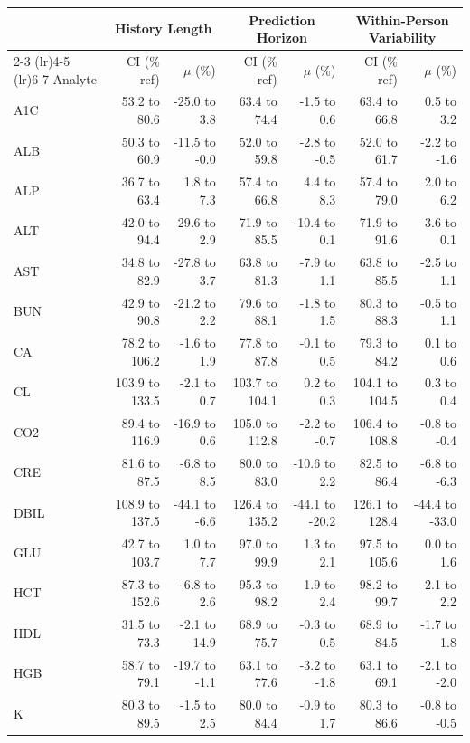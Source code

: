 \begin{table}[ht]
\centering
\footnotesize
\begin{tabular}{lrrrrrr}
\toprule
  & \multicolumn{2}{c}{History Length} & \multicolumn{2}{c}{Prediction Horizon} & \multicolumn{2}{c}{Within-Person Variability} \\
\cmidrule(lr){2-3} \cmidrule(lr){4-5} \cmidrule(lr){6-7}
Analyte & CI (\% ref) & $\mu$ (\%) & CI (\% ref) & $\mu$ (\%) & CI (\% ref) & $\mu$ (\%) \\
\midrule
A1C & 53.2 to 80.6 & -25.0 to 3.8 & 63.4 to 74.4 & -1.5 to 0.6 & 63.4 to 66.8 & 0.5 to 3.2 \\
ALB & 50.3 to 60.9 & -11.5 to -0.0 & 52.0 to 59.8 & -2.8 to -0.5 & 52.0 to 61.7 & -2.2 to -1.6 \\
ALP & 36.7 to 63.4 & 1.8 to 7.3 & 57.4 to 66.8 & 4.4 to 8.3 & 57.4 to 79.0 & 2.0 to 6.2 \\
ALT & 42.0 to 94.4 & -29.6 to 2.9 & 71.9 to 85.5 & -10.4 to 0.1 & 71.9 to 91.6 & -3.6 to 0.1 \\
AST & 34.8 to 82.9 & -27.8 to 3.7 & 63.8 to 81.3 & -7.9 to 1.1 & 63.8 to 85.5 & -2.5 to 1.1 \\
BUN & 42.9 to 90.8 & -21.2 to 2.2 & 79.6 to 88.1 & -1.8 to 1.5 & 80.3 to 88.3 & -0.5 to 1.1 \\
CA & 78.2 to 106.2 & -1.6 to 1.9 & 77.8 to 87.8 & -0.1 to 0.5 & 79.3 to 84.2 & 0.1 to 0.6 \\
CL & 103.9 to 133.5 & -2.1 to 0.7 & 103.7 to 104.1 & 0.2 to 0.3 & 104.1 to 104.5 & 0.3 to 0.4 \\
CO2 & 89.4 to 116.9 & -16.9 to 0.6 & 105.0 to 112.8 & -2.2 to -0.7 & 106.4 to 108.8 & -0.8 to -0.4 \\
CRE & 81.6 to 87.5 & -6.8 to 8.5 & 80.0 to 83.0 & -10.6 to 2.2 & 82.5 to 86.4 & -6.8 to -6.3 \\
DBIL & 108.9 to 137.5 & -44.1 to -6.6 & 126.4 to 135.2 & -44.1 to -20.2 & 126.1 to 128.4 & -44.4 to -33.0 \\
GLU & 42.7 to 103.7 & 1.0 to 7.7 & 97.0 to 99.9 & 1.3 to 2.1 & 97.5 to 105.6 & 0.0 to 1.6 \\
HCT & 87.3 to 152.6 & -6.8 to 2.6 & 95.3 to 98.2 & 1.9 to 2.4 & 98.2 to 99.7 & 2.1 to 2.2 \\
HDL & 31.5 to 73.3 & -2.1 to 14.9 & 68.9 to 75.7 & -0.3 to 0.5 & 68.9 to 84.5 & -1.7 to 1.8 \\
HGB & 58.7 to 79.1 & -19.7 to -1.1 & 63.1 to 77.6 & -3.2 to -1.8 & 63.1 to 69.1 & -2.1 to -2.0 \\
K & 80.3 to 89.5 & -1.5 to 2.5 & 80.0 to 84.4 & -0.9 to 1.7 & 80.3 to 86.6 & -0.8 to -0.5 \\

\end{tabular}
\end{table}
